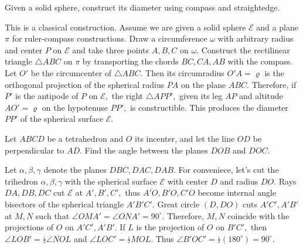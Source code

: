 \documentclass[12pt,a4paper]{memoir}
\theoremstyle{definition}
\begin{document}
\begin{question}[name={Toronto Junior Math Battle}]
	Given a solid sphere, construct its diameter using compass and straightedge.
\end{question}





\begin{solution}[name={Solution by Luis González}] 
	This is a classical construction. Assume we are given a solid sphere $ \mathcal{E}$ and a plane $ \pi$ for ruler-compass constructions. Draw a circumference $ \omega$ with arbitrary radius and center $ P$ on $ \mathcal{E}$ and take three points $ A,B,C$ on $ \omega.$ Construct the rectilinear triangle $ \triangle ABC$ on $ \pi$ by transporting the chords $ BC,CA,AB$ with the compass. Let $ O'$ be the circumcenter of $ \triangle ABC.$ Then its circumradius $ O'A = \varrho$ is the orthogonal projection of the spherical radius $ PA$ on the plane $ ABC.$ Therefore, if $ P'$ is the antipode of $ P$ on $ \mathcal{E},$ the right $ \triangle APP',$ given its leg $ AP$ and altitude $ AO' = \varrho$ on the hypotenuse $ PP',$ is constructible. This produces the diameter $ PP'$ of the spherical surface $ \mathcal{E}.$
\end{solution}





\begin{question}
	Let $ABCD$ be a tetrahedron and $O$ its incenter, and let the line $OD$ be perpendicular to $AD$. Find the angle between the planes $DOB$ and $DOC.$
\end{question}





\begin{solution}[name={Solution by Luis González}] 
	Let $\alpha,\beta,\gamma$ denote the planes $DBC,DAC,DAB.$ For conveniece, let's cut the trihedron $\alpha,\beta,\gamma$ with the spherical surface $\mathcal{E}$ with center $D$ and radius $DO.$ Rays $DA,DB,DC$ cut $\mathcal{E}$ at $A',B',C',$ thus $A'O,B'O,C'O$ become internal angle bisectors of the spherical triangle $A'B'C'.$ Great circle $(D,DO)$ cuts $A'C',A'B'$ at $M,N$ such that $\angle OMA'=\angle ONA'=90^{\circ}$. Therefore, $M,N$ coincide with the projections of $O$ on $A'C',A'B'.$ If $L$ is the projection of $O$ on $B'C',$ then $\angle LOB'=\frac{_1}{^2}\angle NOL$ and $\angle LOC'=\frac{_1}{^2}MOL.$ Thus $\angle B'OC'=\frac{_1}{^2}(180^{\circ})=90^{\circ}.$
\end{solution}
\end{document}
